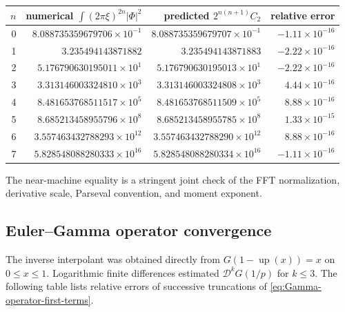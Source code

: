 \documentclass[11pt,oneside]{article}
\numberwithin{equation}{section}
\theoremstyle{plain}
\theoremstyle{definition}
\theoremstyle{remark}
\newcommand{\Up}{\operatorname{up}}
\newcommand{\Dop}{\mathscr D}
\begin{document}
\begin{center}
\small
\begin{tabular}{@{}rrrr@{}}
\toprule
$n$ & numerical $\int(2\pi\xi)^{2n}|\Phi|^2$ & predicted $2^{n(n+1)}C_2$ & relative error\\
\midrule
0 & $8.088735359679706\times10^{-1}$ & $8.088735359679707\times10^{-1}$ & $-1.11\times10^{-16}$\\
1 & $3.235494143871882$ & $3.235494143871883$ & $-2.22\times10^{-16}$\\
2 & $5.176790630195011\times10^{1}$ & $5.176790630195013\times10^{1}$ & $-2.22\times10^{-16}$\\
3 & $3.313146003324810\times10^{3}$ & $3.313146003324808\times10^{3}$ & $4.44\times10^{-16}$\\
4 & $8.481653768511517\times10^{5}$ & $8.481653768511509\times10^{5}$ & $8.88\times10^{-16}$\\
5 & $8.685213458955796\times10^{8}$ & $8.685213458955785\times10^{8}$ & $1.33\times10^{-15}$\\
6 & $3.557463432788293\times10^{12}$ & $3.557463432788290\times10^{12}$ & $8.88\times10^{-16}$\\
7 & $5.828548088280333\times10^{16}$ & $5.828548088280334\times10^{16}$ & $-1.11\times10^{-16}$\\
\bottomrule
\end{tabular}
\end{center}

The near-machine equality is a stringent joint check of the FFT normalization, derivative
scale, Parseval convention, and moment exponent.

\subsection{Euler--Gamma operator convergence}

The inverse interpolant was obtained directly from
$G(1-\Up(x))=x$ on $0\leq x\leq1$.  Logarithmic finite differences estimated
$\Dop^kG(1/p)$ for $k\leq3$.  The following table lists relative errors of successive
truncations of \eqref{eq:Gamma-operator-first-terms}.
\end{document}

